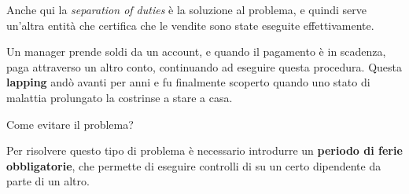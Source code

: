 \begin{Answer} [
  ref={fr2},
  number={2}
 ]

 \Question Anche qui la \textit{separation of duties} è la soluzione al
problema, e quindi serve un'altra entità che certifica che le vendite sono
state eseguite effettivamente.

\end{Answer}


\begin{Exercise} [
  title={Caso di Lepping},
  label={fr3}
 ]

 Un manager prende soldi da un account, e quando il pagamento è in scadenza,
paga attraverso un altro conto, continuando ad eseguire questa procedura.
Questa \textbf{lapping} andò avanti per anni e fu finalmente scoperto quando uno
stato di malattia prolungato la costrinse a stare a casa.

  \Question Come evitare il problema?
\end{Exercise}

\begin{Answer} [
  ref={fr3},
  number={3}
 ]

 \Question Per risolvere questo tipo di problema è necessario introdurre un
\textbf{periodo di ferie obbligatorie}, che permette di eseguire controlli di
su un certo dipendente da parte di un altro.

\end{Answer}

